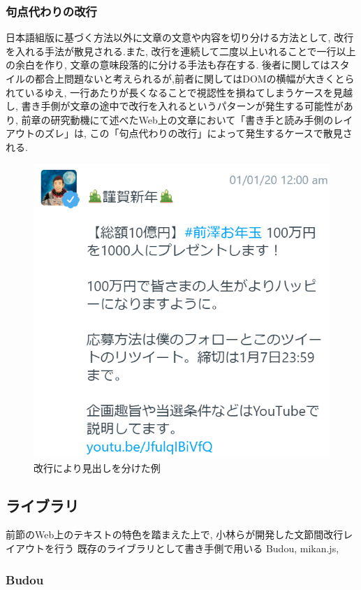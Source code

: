\subsubsection{句点代わりの改行}
日本語組版に基づく方法以外に文章の文意や内容を切り分ける方法として, 改行を入れる手法が散見される.また, 
改行を連続して二度以上いれることで一行以上の余白を作り, 文章の意味段落的に分ける手法も存在する.
後者に関してはスタイルの都合上問題ないと考えられるが,前者に関してはDOMの横幅が大きくとられているゆえ,
一行あたりが長くなることで視認性を損ねてしまうケースを見越し, 書き手側が文章の途中で改行を入れるというパターンが発生する可能性があり, 
前章の研究動機にて述べたWeb上の文章において「書き手と読み手側のレイアウトのズレ」は, この「句点代わりの改行」によって発生するケースで散見される.

\begin{figure}[H]
    \centering
    \label{fig:midashi}
    \includegraphics[width=0.6\columnwidth]{image/02/img_4.png}
    \caption[改行により見出しを分けた例] {改行により見出しを分けた例\footnotemark[1]}
\end{figure}

\subsection{ライブラリ}
前節のWeb上のテキストの特色を踏まえた上で, 小林らが開発した文節間改行レイアウトを行う
既存のライブラリとして書き手側で用いる
Budou\footnotemark[2], mikan.js\footnotemark[3],


\subsubsection{Budou}

